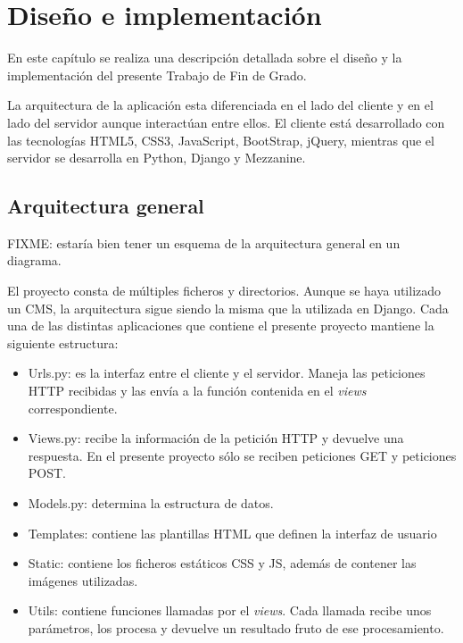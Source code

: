 \cleardoublepage
\chapter{Diseño e implementación}
\label{chap:design_implement}



En este capítulo se realiza una descripción detallada sobre el diseño y la implementación del presente Trabajo de Fin de Grado.


La arquitectura de la aplicación esta diferenciada en el lado del cliente y en el lado del servidor aunque interactúan entre ellos. El cliente está desarrollado con las tecnologías HTML5, CSS3, JavaScript, BootStrap, jQuery, mientras que el servidor se desarrolla en Python, Django y Mezzanine.



\section{Arquitectura general} 
\label{sec:arquitectura}

FIXME: estaría bien tener un esquema de la arquitectura general en un diagrama.

El proyecto consta de múltiples ficheros y directorios. Aunque se haya utilizado un CMS, la arquitectura sigue siendo la misma que la utilizada en Django. Cada una de las distintas aplicaciones que contiene el presente proyecto mantiene la siguiente estructura:
\begin{itemize}
\item Urls.py: es la interfaz entre el cliente y el servidor. Maneja las peticiones HTTP recibidas y las envía a la función contenida en el \textit{views} correspondiente.
\item Views.py: recibe la información de la petición HTTP y devuelve una respuesta. En el presente proyecto sólo se reciben peticiones GET y peticiones POST.
\item Models.py: determina la estructura de datos.
\item Templates: contiene las plantillas HTML que definen la interfaz de usuario
\item Static: contiene los ficheros estáticos CSS y JS, además de contener las imágenes utilizadas.
\item Utils: contiene funciones llamadas por el \textit{views}. Cada llamada recibe unos parámetros, los procesa y devuelve un resultado fruto de ese procesamiento.
\end{itemize}


